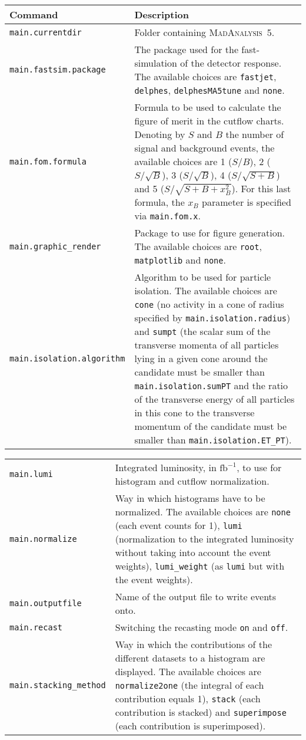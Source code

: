 \documentclass[a4paper]{article}
\newcommand{\MA}{\textsc{MadAnalysis}~5}
\begin{document}
\renewcommand{\arraystretch}{1.2}%
\begin{center}\begin{tabular}{l p{7.50cm}}
\hline
Command & Description\\
\hline
\color{ao} \verb?main.currentdir?     & Folder containing \MA.\\
\color{ao} \verb?main.fastsim.package?& The package used for the fast-simulation of the
  detector response. The available choices are \verb?fastjet?, \verb?delphes?,
  \verb?delphesMA5tune? and \verb?none?.\\
\color{ao} \verb?main.fom.formula?    & Formula to be used to calculate the figure of merit
  in the cutflow charts. Denoting by $S$ and $B$ the number of signal and
  background events, the available choices are 1 ($S/B$), 2 ($S/\sqrt{B}$), 3
  ($S/\sqrt{B}$), 4 ($S/\sqrt{S+B}$) and 5 ($S/\sqrt{S+B+x_B^2}$). For this last
  formula, the $x_B$ parameter is specified via \verb?main.fom.x?.\\
\color{ao} \verb?main.graphic_render? & Package to use for figure generation. The
  available choices are \verb?root?, \verb?matplotlib? and \verb?none?.\\
\color{ao} \verb?main.isolation.algorithm? & Algorithm to be used for particle isolation.
  The available choices are \verb?cone? (no activity in a cone of radius
  specified by \verb+main.isolation.radius+) and \verb+sumpt+ (the scalar sum of
  the transverse momenta of all particles lying in a given cone around the
  candidate must be smaller than \verb?main.isolation.sumPT? and the ratio of
  the transverse energy of all particles in this cone to the transverse momentum
  of the candidate must be smaller than
  \verb?main.isolation.ET_PT?).\\
\end{tabular}
\begin{tabular}{l p{8.4cm}}
\color{ao} \verb?main.lumi? & Integrated luminosity, in $\textrm{fb}^{-1}$, to use for
  histogram and cutflow normalization.\\
\color{ao} \verb?main.normalize? & Way in which histograms have to be normalized. The
  available choices are \verb?none? (each event counts for 1), \verb?lumi?
  (normalization to the integrated luminosity without taking into account the
  event weights), \verb?lumi_weight? (as \verb?lumi? but with the
  event weights).\\
\color{ao} \verb?main.outputfile? & Name of the output file to write events onto.\\
\color{ao} \verb?main.recast? & Switching the recasting mode \verb?on? and \verb?off?.\\
\color{ao} \verb?main.stacking_method? & Way in which the contributions of the different
  datasets to a histogram are displayed. The available choices are
  \verb?normalize2one? (the integral of each contribution equals 1),
  \verb?stack? (each contribution is stacked) and \verb?superimpose? (each
  contribution is superimposed).\\
\hline
\end{tabular}
\end{center}
\newpage 
\end{document}
